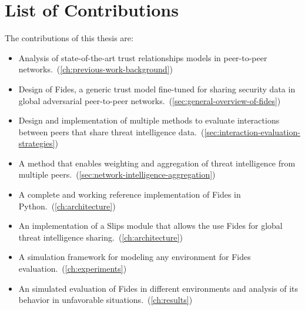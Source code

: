 \newpage
\section{List of Contributions}
\label{sec:list-of-contributions}
\noindent
The contributions of this thesis are:
\begin{itemize}
    \item Analysis of state-of-the-art trust relationships models in peer-to-peer networks.~(\ref{ch:previous-work-background})
    \item Design of Fides, a generic trust model fine-tuned for sharing security data in global adversarial peer-to-peer networks.~(\ref{sec:general-overview-of-fides})
    \item Design and implementation of multiple methods to evaluate interactions between peers that share threat intelligence data.~(\ref{sec:interaction-evaluation-strategies})
    \item A method that enables weighting and aggregation of threat intelligence from multiple peers.~(\ref{sec:network-intelligence-aggregation})
    \item A complete and working reference implementation of Fides in Python.~(\ref{ch:architecture})
    \item An implementation of a Slips module that allows the use Fides for global threat intelligence sharing.~(\ref{ch:architecture})
    \item A simulation framework for modeling any environment for Fides evaluation.~(\ref{ch:experiments})
    \item An simulated evaluation of Fides in different environments and analysis of its behavior in unfavorable situations.~(\ref{ch:results})
\end{itemize}